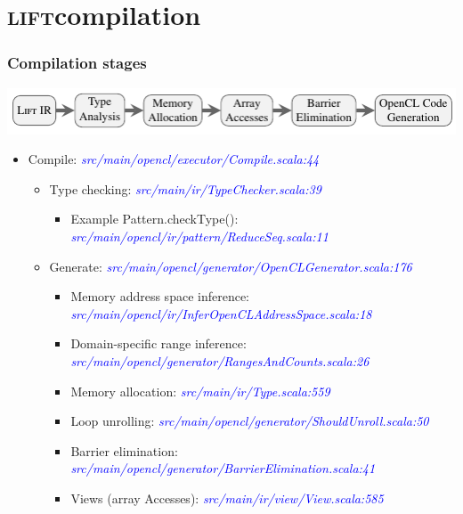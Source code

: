 \documentclass[10pt,usetotalslideindicator]{beamer}
\newcommand{\lift}{\textsc{lift}\space}
\newcommand{\srcurl}[1]{\textcolor{blue}{\textit{#1}}}
\begin{document}
\section{\lift compilation}

\begin{frame}[t]
\frametitle{Compilation stages}
    \vspace{-1cm}
    \begin{block}{}
        \begin{center}
            \includegraphics[width=1\textwidth]{../images/compilation_stages.pdf}
        \end{center}
    \end{block}
    \vspace{-0.5cm}
\begin{itemize}
    \item Compile: \srcurl{src/main/opencl/executor/Compile.scala:44}
    \begin{itemize}
    	\item Type checking: \srcurl{src/main/ir/TypeChecker.scala:39}
    	\begin{itemize}
    		\item Example Pattern.checkType(): \srcurl{src/main/opencl/ir/pattern/ReduceSeq.scala:11}
    	\end{itemize}
    	\item Generate: \srcurl{src/main/opencl/generator/OpenCLGenerator.scala:176}
    	\begin{itemize}
    		\item Memory address space inference: \srcurl{src/main/opencl/ir/InferOpenCLAddressSpace.scala:18}
    		\item Domain-specific range inference: \srcurl{src/main/opencl/generator/RangesAndCounts.scala:26}
    		\item Memory allocation: \srcurl{src/main/ir/Type.scala:559}
    		\item Loop unrolling: \srcurl{src/main/opencl/generator/ShouldUnroll.scala:50}
    		\item Barrier elimination: \srcurl{src/main/opencl/generator/BarrierElimination.scala:41}
    		\item Views (array Accesses): \srcurl{src/main/ir/view/View.scala:585}
    	\end{itemize}
    \end{itemize}
\end{itemize}
\end{frame}
\end{document}
